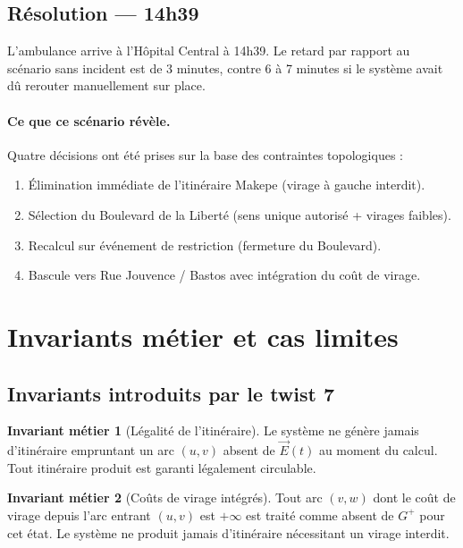 \documentclass[12pt,a4paper]{article}
\theoremstyle{definition}
\newtheorem{invariant}{Invariant métier}[section]
\theoremstyle{remark}
\begin{document}
\subsection{Résolution — 14h39}

L'ambulance arrive à l'Hôpital Central à 14h39. Le retard par rapport
au scénario sans incident est de 3 minutes, contre 6 à 7 minutes si
le système avait dû rerouter manuellement sur place.

\paragraph{Ce que ce scénario révèle.}
Quatre décisions ont été prises sur la base des contraintes topologiques :

\begin{enumerate}[leftmargin=2em, itemsep=4pt]
  \item Élimination immédiate de l'itinéraire Makepe (virage à gauche interdit).
  \item Sélection du Boulevard de la Liberté (sens unique autorisé + virages faibles).
  \item Recalcul sur événement de restriction (fermeture du Boulevard).
  \item Bascule vers Rue Jouvence / Bastos avec intégration du coût de virage.
\end{enumerate}

\newpage

\section{Invariants métier et cas limites}

\subsection{Invariants introduits par le twist 7}

\begin{invariant}[Légalité de l'itinéraire]
\label{inv:legal}
Le système ne génère jamais d'itinéraire empruntant un arc $(u,v)$
absent de $\vec{E}(t)$ au moment du calcul. Tout itinéraire produit
est garanti légalement circulable.
\end{invariant}

\begin{invariant}[Coûts de virage intégrés]
\label{inv:virage}
Tout arc $(v,w)$ dont le coût de virage depuis l'arc entrant
$(u,v)$ est $+\infty$ est traité comme absent de $G^+$ pour cet
état. Le système ne produit jamais d'itinéraire nécessitant un
virage interdit.
\end{invariant}
\end{document}
